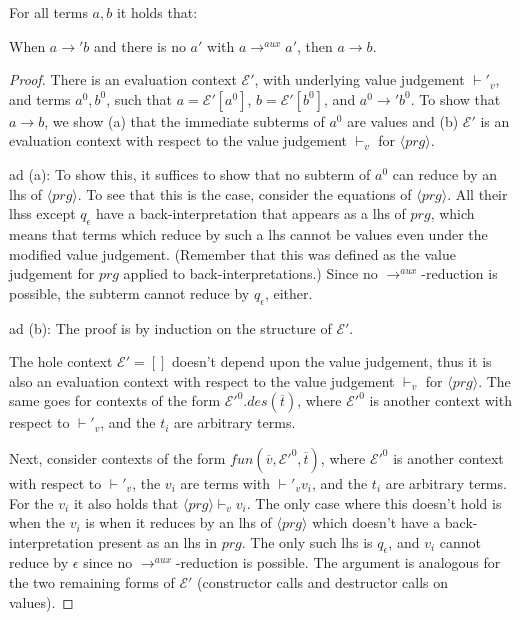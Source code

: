 \begin{lemma}

For all terms $a,b$ it holds that:

When $a \longrightarrow' b$ and there is no $a'$ with $a \longrightarrow^{aux} a'$, then $a \longrightarrow b$.

\begin{proof}

There is an evaluation context $\mathcal{E}'$, with underlying value judgement $\vdash'_v$, and terms $a^0, b^0$, such that $a = \mathcal{E}'[a^0]$, $b = \mathcal{E}'[b^0]$, and $a^0 \longrightarrow' b^0$. To show that $a \longrightarrow b$, we show (a) that the immediate subterms of $a^0$ are values and (b) $\mathcal{E}'$ is an evaluation context with respect to the value judgement $\vdash_v$ for $\langle prg \rangle$.

ad (a): To show this, it suffices to show that no subterm of $a^0$ can reduce by an lhs of $\langle prg \rangle$. To see that this is the case, consider the equations of $\langle prg \rangle$. All their lhss except $q_\epsilon$ have a back-interpretation that appears as a lhs of $prg$, which means that terms which reduce by such a lhs cannot be values even under the modified value judgement. (Remember that this was defined as the value judgement for $prg$ applied to back-interpretations.) Since no $\longrightarrow^{aux}$-reduction is possible, the subterm cannot reduce by $q_\epsilon$, either.

ad (b): The proof is by induction on the structure of $\mathcal{E}'$.

The hole context $\mathcal{E}' = []$ doesn't depend upon the value judgement, thus it is also an evaluation context with respect to the value judgement $\vdash_v$ for $\langle prg \rangle$. The same goes for contexts of the form $\mathcal{E}'^0.des(\overline{t})$, where $\mathcal{E}'^0$ is another context with respect to $\vdash'_v$, and the $t_i$ are arbitrary terms.

Next, consider contexts of the form $fun(\overline{v}, \mathcal{E}'^0, \overline{t})$, where $\mathcal{E}'^0$ is another context with respect to $\vdash'_v$, the $v_i$ are terms with $\vdash'_v v_i$, and the $t_i$ are arbitrary terms. For the $v_i$ it also holds that $\langle prg \rangle \vdash_v v_i$. The only case where this doesn't hold is when the $v_i$ is when it reduces by an lhs of $\langle prg \rangle$ which doesn't have a back-interpretation present as an lhs in $prg$. The only such lhs is $q_\epsilon$, and $v_i$ cannot reduce by $\epsilon$ since no $\longrightarrow^{aux}$-reduction is possible. The argument is analogous for the two remaining forms of $\mathcal{E}'$ (constructor calls and destructor calls on values).

\end{proof}
\end{lemma}


